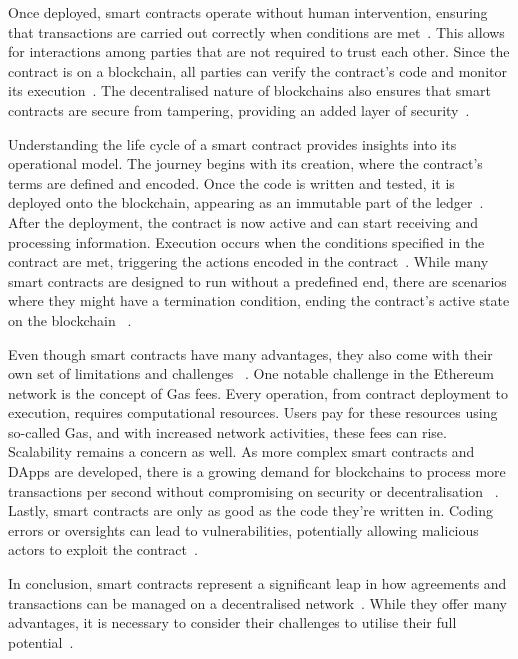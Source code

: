 Once deployed, smart contracts operate without human intervention, ensuring that transactions are carried out correctly when conditions are met~\cite{UchaniGutierrez.2023}. This allows for interactions among parties that are not required to trust each other. Since the contract is on a blockchain, all parties can verify the contract's code and monitor its execution~\cite{UchaniGutierrez.2023}. The decentralised nature of blockchains also ensures that smart contracts are secure from tampering, providing an added layer of security~\cite{Zhou.2022}.

Understanding the life cycle of a smart contract provides insights into its operational model. The journey begins with its creation, where the contract's terms are defined and encoded. Once the code is written and tested, it is deployed onto the blockchain, appearing as an immutable part of the ledger~\cite{Tran.2022b}. After the deployment, the contract is now active and can start receiving and processing information. Execution occurs when the conditions specified in the contract are met, triggering the actions encoded in the contract~\cite{Pierro.}. While many smart contracts are designed to run without a predefined end, there are scenarios where they might have a termination condition, ending the contract's active state on the blockchain ~\cite{Tran.2022b}.

Even though smart contracts have many advantages, they also come with their own set of limitations and challenges ~\cite{.2019}. One notable challenge in the Ethereum network is the concept of Gas fees. Every operation, from contract deployment to execution, requires computational resources. Users pay for these resources using so-called Gas, and with increased network activities, these fees can rise. Scalability remains a concern as well. As more complex smart contracts and DApps are developed, there is a growing demand for blockchains to process more transactions per second without compromising on security or decentralisation ~\cite{Tran.2022b}. Lastly, smart contracts are only as good as the code they're written in. Coding errors or oversights can lead to vulnerabilities, potentially allowing malicious actors to exploit the contract~\cite{Zhou.2022}.

In conclusion, smart contracts represent a significant leap in how agreements and transactions can be managed on a decentralised network~\cite{.2019}. While they offer many advantages, it is necessary to consider their challenges to utilise their full potential~\cite{.2019}.

